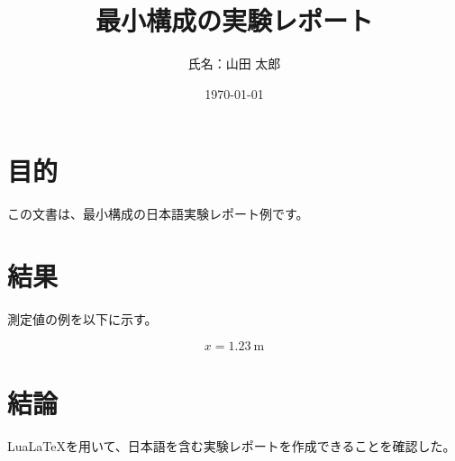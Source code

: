 \documentclass[a4paper,11pt]{ltjsarticle}
\title{最小構成の実験レポート}
\author{氏名：山田 太郎}
\date{\today}
\begin{document}
\maketitle

\section{目的}

この文書は、最小構成の日本語実験レポート例です。

\section{結果}

測定値の例を以下に示す。

\begin{equation}
  x = \SI{1.23}{\meter}
\end{equation}

\section{結論}

LuaLaTeXを用いて、日本語を含む実験レポートを作成できることを確認した。
\end{document}
